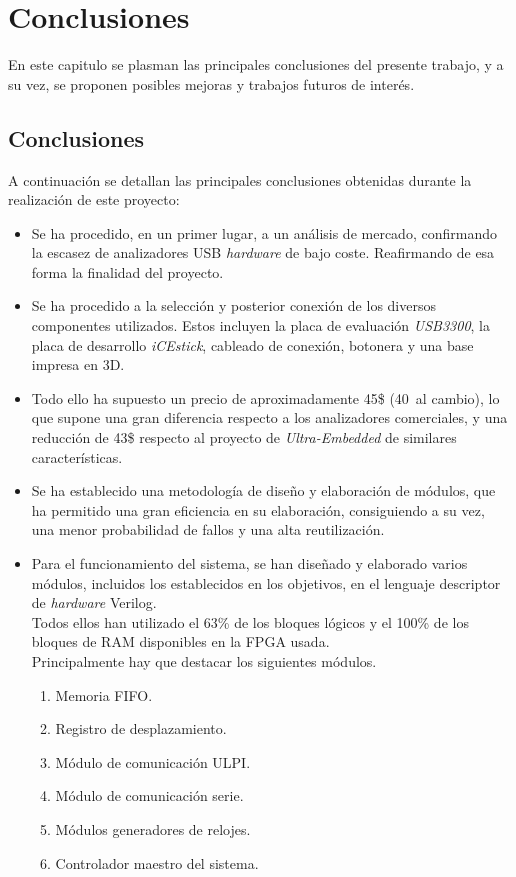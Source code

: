 \chapter{Conclusiones}
\label{ch:conclusiones}

En este capitulo se plasman las principales conclusiones del presente trabajo, y a su vez, se proponen posibles mejoras y trabajos futuros de interés.

\section{Conclusiones}
A continuación se detallan las principales conclusiones obtenidas durante la realización de este proyecto:

\begin{itemize}
    \item Se ha procedido, en un primer lugar, a un análisis de mercado, confirmando la escasez de analizadores USB \emph{hardware} de bajo coste. Reafirmando de esa forma la finalidad del proyecto.
    
    \item Se ha procedido a la selección y posterior conexión de los diversos componentes utilizados. Estos incluyen la placa de evaluación \emph{USB3300}, la placa de desarrollo \emph{iCEstick}, cableado de conexión, botonera y una base impresa en 3D.
    
    \item Todo ello ha supuesto un precio de aproximadamente 45\$ (40\texteuro~al cambio), lo que supone una gran diferencia respecto a los analizadores comerciales, y una reducción de 43\$ respecto al proyecto de \emph{Ultra-Embedded} de similares características.
    
    \item Se ha establecido una metodología de diseño y elaboración de módulos, que ha permitido una gran eficiencia en su elaboración, consiguiendo a su vez, una menor probabilidad de fallos y una alta reutilización.
    
    \item Para el funcionamiento del sistema, se han diseñado y elaborado varios módulos, incluidos los establecidos en los objetivos, en el lenguaje descriptor de \emph{hardware} Verilog. \\
    Todos ellos han utilizado el 63\% de los bloques lógicos y el 100\% de los bloques de RAM disponibles en la FPGA usada. \\
    Principalmente hay que destacar los siguientes módulos.
    \begin{enumerate}
        \item Memoria FIFO.
        \item Registro de desplazamiento.
        \item Módulo de comunicación ULPI.
        \item Módulo de comunicación serie.
        \item Módulos generadores de relojes.
        \item Controlador maestro del sistema.
    \end{enumerate}


\end{itemize}
